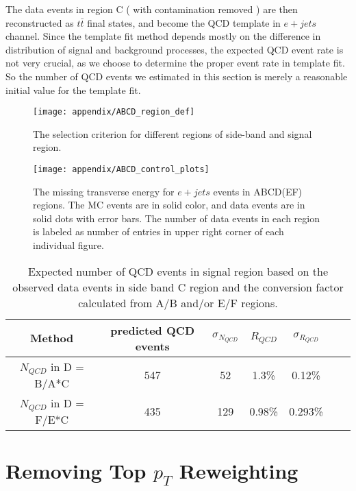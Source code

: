 \documentclass{cmspaperpdf}
\begin{document}
The data events in region C ( with contamination removed ) are then reconstructed as $t\bar{t}$ final states, and become the QCD template in $e+jets$ channel. Since the template fit method depends mostly on the difference in distribution of signal and background processes, the expected QCD event rate is not very crucial, as we choose to determine the proper event rate in template fit. So the number of QCD events we estimated in this section is merely a reasonable initial value for the template fit. 

 \begin{figure}[hbt]
  \begin{center}
    \texttt{[image: appendix/ABCD\_region\_def]}
  \caption{\small The selection criterion for different regions of side-band and signal region.}
    \label{fig:ABCD-def}
  \end{center}
\end{figure}

 \begin{figure}[hbt]
  \begin{center}
    \texttt{[image: appendix/ABCD\_control\_plots]}
  \caption{\small The missing transverse energy for $e+jets$ events in ABCD(EF) regions. The MC events are in solid color, and data events are in solid dots with error bars. The number of data events in each region is labeled as number of entries in upper right corner of each individual figure. }
    \label{fig:ABCD-MET}
  \end{center}
\end{figure}

\begin{table}[htb]
\centering
\begin{tabular}{c|cc|cccc}
Method & predicted QCD events  &  $\sigma_{N_{QCD}}$ & $R_{QCD}$ & $\sigma_{R_{QCD}}$ \\
\hline
$N_{QCD}$ in D = B/A*C      &  547 &   52 &          1.3\% &         0.12\%  \\
$N_{QCD}$ in D = F/E*C      &  435 &   129 &          0.98\% &         0.293\%  \\
\hline
\end{tabular}
\caption{Expected number of QCD events in signal region based on the observed data events in side band C region and the conversion factor calculated from A/B and/or E/F regions.}
\label{tab:ABCD - QCD numbers}
\end{table}

\clearpage
\section{Removing Top $p_{T}$ Reweighting}
\label{sec:top pt removal}
\end{document}
